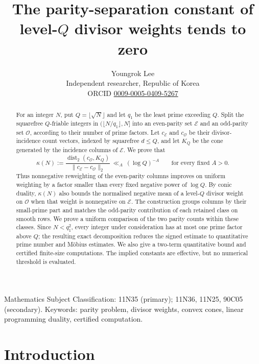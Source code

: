 \documentclass[11pt,a4paper]{article}
\title{The parity-separation constant of level-$Q$ divisor weights
tends to zero}
\author{Youngrok Lee\\
\small Independent researcher, Republic of Korea\\ \small ORCID \href{https://orcid.org/0009-0005-0409-5267}{0009-0005-0409-5267}}
\date{}
\theoremstyle{plain}
\theoremstyle{definition}
\theoremstyle{remark}
\DeclareMathOperator{\dist}{dist}
\newcommand{\vB}{\mathcal{E}}
\newcommand{\vR}{\mathcal{O}}
\begin{document}
\maketitle

\begin{abstract}
For an integer $N$, put $Q=\lfloor\sqrt N\rfloor$ and let $q_1$ be the least prime exceeding $Q$.
Split the squarefree $Q$-friable integers in $(\lfloor N/q_1\rfloor,N]$ into an even-parity set
$\vB$ and an odd-parity set $\vR$, according to their number of prime factors.
Let $c_{\vB}$ and $c_{\vR}$ be their divisor-incidence count vectors, indexed by squarefree $d\le Q$,
and let $K_Q$ be the cone generated by the incidence columns of $\vB$. We prove that
\[
  \kappa(N):=\frac{\dist_2(c_{\vR},K_Q)}{\|c_{\vB}-c_{\vR}\|_2}
  \ \ll_A\ (\log Q)^{-A}
  \qquad\text{for every fixed }A>0.
\]
Thus nonnegative reweighting of the even-parity columns improves on uniform weighting by a factor
smaller than every fixed negative power of $\log Q$. By conic duality, $\kappa(N)$ also bounds the
normalised negative mean of a level-$Q$ divisor weight on $\vR$ when that weight is nonnegative on $\vB$.
The construction groups columns by their small-prime part and matches the odd-parity contribution
of each retained class on smooth rows. We prove a uniform comparison of the two parity counts within
these classes. Since $N<q_1^2$, every integer under consideration has at most one prime factor above
$Q$; the resulting exact decomposition reduces the signed estimate to quantitative prime number
and M\"obius estimates. We also give a two-term quantitative bound and certified finite-size
computations. The implied constants are effective, but no numerical threshold is evaluated.

\end{abstract}

{\small{} Mathematics Subject Classification: 11N35 (primary); 11N36, 11N25,
90C05 (secondary). Keywords: parity problem, divisor weights, convex cones, linear programming
duality, certified computation.\par}

\section{Introduction}\label{sec:intro}
\end{document}
